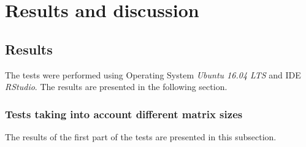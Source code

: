 \chapter{Results and discussion}
\label{sec:results}
\section{Results}
The tests were performed using Operating System \textit{Ubuntu 16.04 LTS} and IDE \textit{RStudio}. The results are presented in the following section.

\subsection{Tests taking into account different matrix sizes}
The results of the first part of the tests are presented in this subsection.
